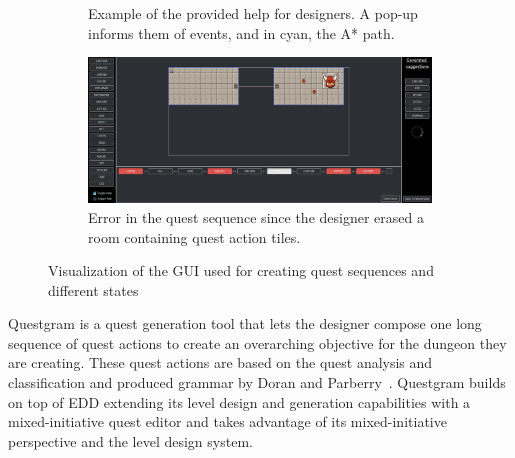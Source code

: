 \begin{figure}[t]
\begin{subfigure}[t]{0.48\textwidth}
        \caption{Example of the provided help for designers. A pop-up informs them of events, and in cyan, the A* path.}
        \label{figs:GUI:help}
    \end{subfigure}%
     \begin{subfigure}[t]{0.48\textwidth}
        \centering
        \includegraphics[width=.99\textwidth]{included-papers-tex/paper-8/figures/main-errorQ.png}
        \caption{Error in the quest sequence since the designer erased a room containing quest action tiles.}
        \label{figs:GUI:error}
    \end{subfigure} \hfill%
    \caption{Visualization of the GUI used for creating quest sequences and different states}
    \label{figs:GUI}
\end{figure}

Questgram is a quest generation tool that lets the designer compose one long sequence of quest actions to create an overarching objective for the dungeon they are creating. These quest actions are based on the quest analysis and classification and produced grammar by Doran and Parberry~. Questgram builds on top of EDD extending its level design and generation capabilities with a mixed-initiative quest editor and takes advantage of its mixed-initiative perspective and the level design system.






